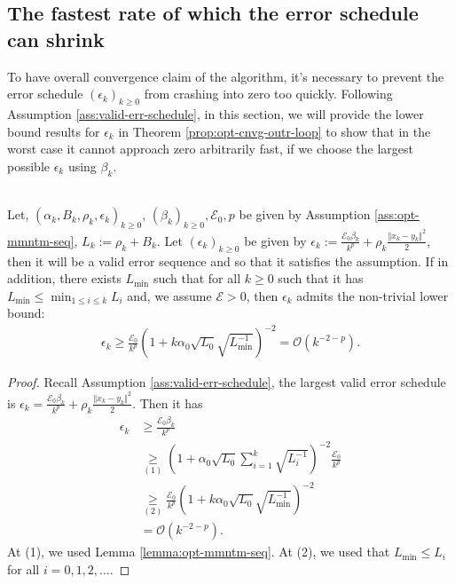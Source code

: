 \documentclass[12pt]{article}
\begin{document}
    \subsection{The fastest rate of which the error schedule can shrink}
        To have overall convergence claim of the algorithm, it's necessary to prevent the error schedule $(\epsilon_k)_{k \ge 0}$ from crashing into zero too quickly. 
        Following Assumption \ref{ass:valid-err-schedule}, in this section, we will provide the lower bound results for $\epsilon_k$ in Theorem \ref{prop:opt-cnvg-outr-loop} to show that in the worst case it cannot approach zero arbitrarily fast, if we choose the largest possible $\epsilon_k$ using $\beta_k$. 
        \begin{lemma}\;\label{lemma:err-schedule-lbnd}\\
            Let, $(\alpha_k, B_k, \rho_k, \epsilon_k)_{k \ge 0}$, $(\beta_k)_{k\ge 0}, \mathcal E_0, p$ be given by Assumption \ref{ass:opt-mmntm-seq}, $L_k := \rho_k + B_k$. 
            Let $(\epsilon_k)_{k \ge 0}$ be given by $\epsilon_k := \frac{\mathcal E_0 \beta_k}{k^p} + \rho_k \frac{\Vert x_k - y_k\Vert^2}{2}$, then it will be a valid error sequence and so that it satisfies the assumption. 
            If in addition, there exists $L_{\min}$ such that for all $k\ge 0$ such that it has $L_{\min} \le \min_{1 \le i \le k}L_i$ and, we assume $\mathcal E > 0$, then $\epsilon_k$ admits the non-trivial lower bound: 
            \begin{align*}
                \epsilon_k \ge \frac{\mathcal E_0}{k^p}\left(
                    1 + k \alpha_0 \sqrt{L_0} \sqrt{L_{\min}^{-1}}
                \right)^{-2} = \mathcal O(k^{-2-p}). 
            \end{align*}
        \end{lemma}
        \begin{proof}
            Recall Assumption \ref{ass:valid-err-schedule}, the largest valid error schedule is $\epsilon_k = \frac{\mathcal E_0 \beta_k}{k^p} + \rho_k \frac{\Vert x_k - y_k\Vert^2}{2}$. 
            Then it has 
            \begin{align*}
                \epsilon_k &\ge \frac{\mathcal E_0 \beta_k}{k^p}
                \\
                &\underset{(1)}{\ge} 
                \left(
                    1 + \alpha_0\sqrt{L_0}\sum_{i = 1}^{k}\sqrt{L_i^{-1}}
                \right)^{-2} 
                \frac{\mathcal E_0}{k^p}
                \\
                &\underset{(2)}{\ge}
                \frac{\mathcal E_0}{k^p}
                \left(
                    1 + k\alpha_0\sqrt{L_0}\sqrt{L_{\min}^{-1}}
                \right)^{-2} 
                \\
                &= \mathcal O(k^{-2-p}). 
            \end{align*}
            At (1), we used Lemma \ref{lemma:opt-mmntm-seq}. 
            At (2), we used that $L_{\min} \le L_i$ for all $i = 0, 1, 2, \ldots$. 
        \end{proof}
\end{document}
